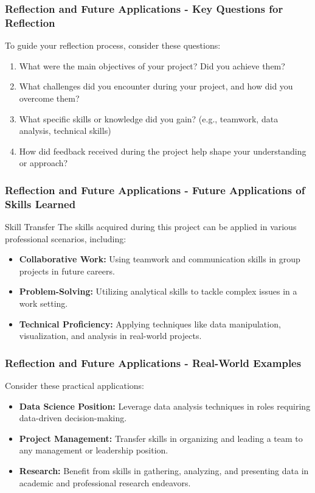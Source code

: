 \documentclass[aspectratio=169]{beamer}
\begin{document}
\begin{frame}[fragile]
    \frametitle{Reflection and Future Applications - Key Questions for Reflection}
    To guide your reflection process, consider these questions:
    \begin{enumerate}
        \item What were the main objectives of your project? Did you achieve them?
        \item What challenges did you encounter during your project, and how did you overcome them?
        \item What specific skills or knowledge did you gain? (e.g., teamwork, data analysis, technical skills)
        \item How did feedback received during the project help shape your understanding or approach?
    \end{enumerate}
\end{frame}

\begin{frame}[fragile]
    \frametitle{Reflection and Future Applications - Future Applications of Skills Learned}
    \begin{block}{Skill Transfer}
        The skills acquired during this project can be applied in various professional scenarios, including:
    \end{block}
    \begin{itemize}
        \item \textbf{Collaborative Work:} Using teamwork and communication skills in group projects in future careers.
        \item \textbf{Problem-Solving:} Utilizing analytical skills to tackle complex issues in a work setting.
        \item \textbf{Technical Proficiency:} Applying techniques like data manipulation, visualization, and analysis in real-world projects.
    \end{itemize}
\end{frame}

\begin{frame}[fragile]
    \frametitle{Reflection and Future Applications - Real-World Examples}
    Consider these practical applications:
    \begin{itemize}
        \item \textbf{Data Science Position:} Leverage data analysis techniques in roles requiring data-driven decision-making.
        \item \textbf{Project Management:} Transfer skills in organizing and leading a team to any management or leadership position.
        \item \textbf{Research:} Benefit from skills in gathering, analyzing, and presenting data in academic and professional research endeavors.
    \end{itemize}
\end{frame}
\end{document}
